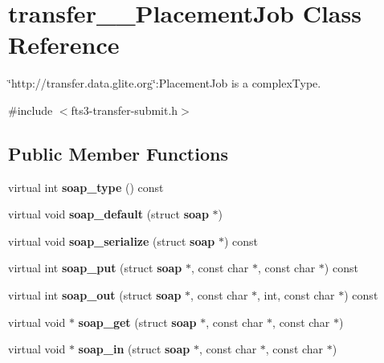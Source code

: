\section{transfer\_\-\_\-PlacementJob Class Reference}
\label{classtransfer____PlacementJob}


\char`\"{}http://transfer.data.glite.org\char`\"{}:PlacementJob is a complexType.  




{\ttfamily \#include $<$fts3-\/transfer-\/submit.h$>$}

\subsection*{Public Member Functions}
\begin{DoxyCompactItemize}
\item 
virtual int {\bfseries soap\_\-type} () const \label{classtransfer____PlacementJob_a0be56c445df6d33a69ed8781ec40d4fa}

\item 
virtual void {\bfseries soap\_\-default} (struct {\bf soap} $\ast$)\label{classtransfer____PlacementJob_a448e5b078c6d6fe135dd7da6949b64b5}

\item 
virtual void {\bfseries soap\_\-serialize} (struct {\bf soap} $\ast$) const \label{classtransfer____PlacementJob_aa11688cb486a61b02c7639268eeba9ae}

\item 
virtual int {\bfseries soap\_\-put} (struct {\bf soap} $\ast$, const char $\ast$, const char $\ast$) const \label{classtransfer____PlacementJob_a39ef8874307babb95c085758e667cfef}

\item 
virtual int {\bfseries soap\_\-out} (struct {\bf soap} $\ast$, const char $\ast$, int, const char $\ast$) const \label{classtransfer____PlacementJob_a55cf5be328877c60a55a9242a51577de}

\item 
virtual void $\ast$ {\bfseries soap\_\-get} (struct {\bf soap} $\ast$, const char $\ast$, const char $\ast$)\label{classtransfer____PlacementJob_a162fa1b623c41a226ecb230f97aed102}

\item 
virtual void $\ast$ {\bfseries soap\_\-in} (struct {\bf soap} $\ast$, const char $\ast$, const char $\ast$)\label{classtransfer____PlacementJob_a948213e07ff28d0457a91250fa572891}

\end{DoxyCompactItemize}
